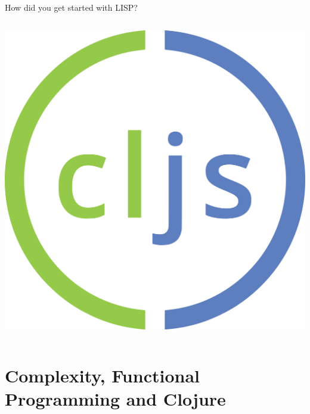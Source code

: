 \documentclass[bigger]{beamer}
\begin{document}
\begin{frame}[label=sec-1-5]{How did you get started with LISP?}
\begin{columns}
\begin{column}{0.45\textwidth}
\begin{block}{}
\center\includegraphics[height=0.25\textheight]{images/clojurescript_logo.png}
\end{block}
\end{column}
\end{columns}
\end{frame}


\section{Complexity, Functional Programming and Clojure}
\label{sec-2}
\end{document}
